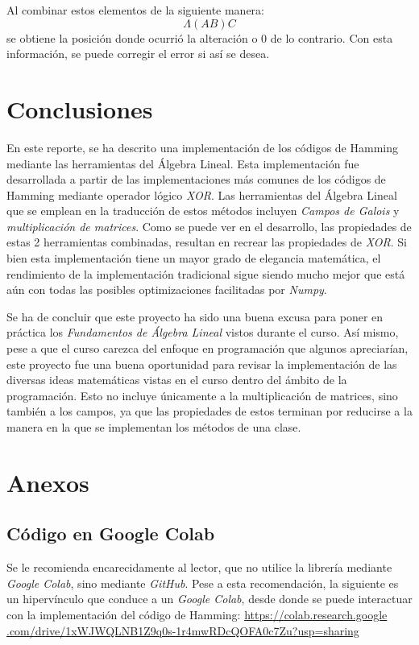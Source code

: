 \documentclass{article}
\begin{document}
Al combinar estos elementos de la siguiente manera:
$$
\Lambda(AB)C
$$
se obtiene la posición donde ocurrió la alteración o $0$ de lo contrario. Con esta información, se puede corregir el error si así se desea.

\section{Conclusiones}

En este reporte, se ha descrito una implementación de los códigos de Hamming mediante las herramientas del Álgebra Lineal. Esta implementación fue desarrollada a partir de las implementaciones más comunes de los códigos de Hamming mediante operador lógico \textit{XOR}. Las herramientas del Álgebra Lineal que se emplean en la traducción de estos métodos incluyen \textit{Campos de Galois} y \textit{multiplicación de matrices}. Como se puede ver en el desarrollo, las propiedades de estas 2 herramientas combinadas, resultan en recrear las propiedades de \textit{XOR}. Si bien esta implementación tiene un mayor grado de elegancia matemática, el rendimiento de la implementación tradicional sigue siendo mucho mejor que está aún con todas las posibles optimizaciones facilitadas por \textit{Numpy}.

Se ha de concluir que este proyecto ha sido una buena excusa para poner en práctica los \textit{Fundamentos de Álgebra Lineal} vistos durante el curso. Así mismo, pese a que el curso carezca del enfoque en programación que algunos apreciarían, este proyecto fue una buena oportunidad para revisar la implementación de las diversas ideas matemáticas vistas en el curso dentro del ámbito de la programación. Esto no incluye únicamente a la multiplicación de matrices, sino también a los campos, ya que las propiedades de estos terminan por reducirse a la manera en la que se implementan los métodos de una clase. 

\section{Anexos}

\subsection{Código en Google Colab}

Se le recomienda encarecidamente al lector, que no utilice la librería mediante \textit{Google Colab}, sino mediante \textit{GitHub}. Pese a esta recomendación, la siguiente es un hipervínculo que conduce a un \textit{Google Colab}, desde donde se puede interactuar con la implementación del código de Hamming: \href{https://colab.research.google.com/drive/1xWJWQLNB1Z9q0s-1r4mwRDcQOFA0c7Zu?usp=sharing}{https://colab.research.google}\\\href{https://colab.research.google.com/drive/1xWJWQLNB1Z9q0s-1r4mwRDcQOFA0c7Zu?usp=sharing}{.com/drive/1xWJWQLNB1Z9q0s-1r4mwRDcQOFA0c7Zu?usp=sharing}
\end{document}

